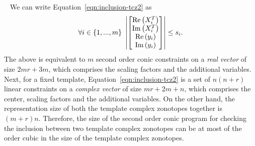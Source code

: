 \begin{remark}~\label{rem:socc}
  We can write Equation~\ref{eqn:inclusion-tcz2} as
  \[
\forall
i\in\left\{1,...,m\right\}~\left|\left[\begin{matrix}\operatorname{Re}\left(X^T_i\right)\\\operatorname{Im}\left(X^T_i\right)\\\operatorname{Re}\left(y_i\right)\\\operatorname{Im}\left(y_i\right)\end{matrix}\right]\right|\leq s_i.
  \]
%
  The above is equivalent to $m$ second order conic constraints on a
  \emph{real vector} of size $2mr+3m$, which comprises the scaling
  factors and the additional variables.  Next, for a fixed template,
  Equation~\ref{eqn:inclusion-tcz2} is a set of $n(n+r)$ linear
  constraints on a \emph{complex vector} of size $mr+2m+n$, which
  comprises the center, scaling factors and the additional variables.
  On the other hand, the representation size of both the template
  complex zonotopes together is $(m+r)n$.  Therefore, the size of the
  second order conic program for checking the inclusion between two
  template complex zonotopes can be at most of the order cubic in the
  size of the template complex zonotopes.
\end{remark}
%
%

